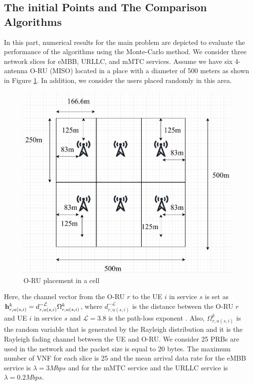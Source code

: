 \documentclass[conference]{IEEEtran}
\begin{document}
\subsection{The initial Points and The Comparison Algorithms}
In this part, numerical results for the main problem are depicted to evaluate the performance of the algorithms using the Monte-Carlo method. We consider three network slices for eMBB, URLLC, and mMTC services.
Assume we have six 4-antenna O-RU (MISO) located in a place with a diameter of 500 meters as shown in Figure \ref{fig:cell}. In addition, we consider the users placed randomly in this area.
\begin{figure}
  \centering 
    \includegraphics[scale = 0.47]{cell.pdf}
  \caption{O-RU placement in a cell}
  \label{fig:cell}
\end{figure}
Here, the channel vector from the O-RU $r$ to the UE $i$ in service $s$ is set as $\bold{h}_{r,u(s,i)}^{k}=d_{r,u(s,i)}^{-\mathcal{L}} \Omega_{r,u(s,i)}^{k} $, where $d_{r,u(s,i)}^{-\mathcal{L}} $ is the distance between the O-RU $r$ and UE $i$ in service $s$ and $\mathcal{L} = 3.8$ is the path-loss exponent \cite{gholipoor2020cloud}.
Also, $\Omega_{r,u(s,i)}^{k}$ is the random variable that is generated by the Rayleigh distribution and it is the Rayleigh fading channel between the UE and O-RU.
We consider 25 PRBs are used in the network and the packet size is equal to 20 bytes.
The maximum number of VNF for each slice is 25 and the mean arrival data rate for the eMBB service is $\lambda  = 3Mbps$ and for the mMTC service and the URLLC  service is $\lambda  = 0.2Mbps$. 
\end{document}
